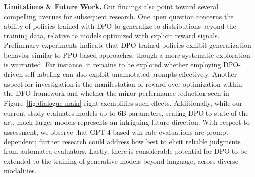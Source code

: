 \textbf{Limitations \& Future Work.} Our findings also point toward several compelling avenues for subsequent research. One open question concerns the ability of policies trained with DPO to generalize to distributions beyond the training data, relative to models optimized with explicit reward signals. Preliminary experiments indicate that DPO-trained policies exhibit generalization behavior similar to PPO-based approaches, though a more systematic exploration is warranted. For instance, it remains to be explored whether employing DPO-driven self-labeling can also exploit unannotated prompts effectively. Another aspect for investigation is the manifestation of reward over-optimization within the DPO framework and whether the minor performance reduction seen in Figure~\ref{fig:dialogue-main}-right exemplifies such effects. Additionally, while our current study evaluates models up to 6B parameters, scaling DPO to state-of-the-art, much larger models represents an intriguing future direction. With respect to assessment, we observe that GPT-4-based win rate evaluations are prompt-dependent; further research could address how best to elicit reliable judgments from automated evaluators. Lastly, there is considerable potential for DPO to be extended to the training of generative models beyond language, across diverse modalities.